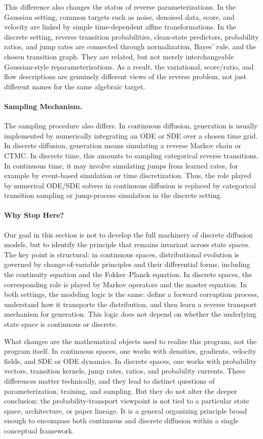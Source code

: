 This difference also changes the status of reverse parameterizations. In the Gaussian setting, common targets such as noise, denoised data, score, and velocity are linked by simple time-dependent affine transformations. In the discrete setting, reverse transition probabilities, clean-state predictors, probability ratios, and jump rates are connected through normalization, Bayes' rule, and the chosen transition graph. They are related, but not merely interchangeable Gaussian-style reparameterizations. As a result, the variational, score/ratio, and flow descriptions are genuinely different views of the reverse problem, not just different names for the same algebraic target.

\paragraph{Sampling Mechanism.}
The sampling procedure also differs.  In continuous diffusion, generation is
usually implemented by numerically integrating an ODE or SDE over a chosen time
grid.  In discrete diffusion, generation means simulating a reverse Markov
chain or CTMC\@.  In discrete time, this amounts to sampling categorical reverse
transitions.  In continuous time, it may involve simulating jumps from learned
rates, for example by event-based simulation or time discretization.  Thus,
the role played by numerical ODE/SDE solvers in continuous diffusion is replaced
by categorical transition sampling or jump-process simulation in the discrete
setting.

\paragraph{Why Stop Here?}
Our goal in this section is not to develop the full machinery of discrete diffusion models, but to identify the principle that remains invariant across state spaces. The key point is structural: in continuous spaces, distributional evolution is governed by change-of-variable principles and their differential forms, including the continuity equation and the Fokker--Planck equation. In discrete spaces, the corresponding role is played by Markov operators and the master equation. In both settings, the modeling logic is the same: define a forward corruption process, understand how it transports the distribution, and then learn a reverse transport mechanism for generation. This logic does not depend on whether the underlying state space is continuous or discrete.

What changes are the mathematical objects used to realize this program, not the program itself. In continuous spaces, one works with densities, gradients, velocity fields, and SDE or ODE dynamics. In discrete spaces, one works with probability vectors, transition kernels, jump rates, ratios, and probability currents. These differences matter technically, and they lead to distinct questions of parameterization, training, and sampling. But they do not alter the deeper conclusion: the probability-transport viewpoint is not tied to a particular state space, architecture, or paper lineage. It is a general organizing principle broad enough to encompass both continuous and discrete diffusion within a single conceptual framework.

